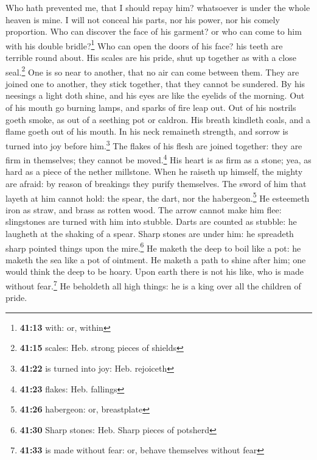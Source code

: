  Who hath prevented me, that I should repay him?
whatsoever is under the whole heaven is mine.  I will not
conceal his parts, nor his power, nor his comely proportion.
 Who can discover the face of his garment? or who can
come to him with his double bridle?\footnote{\textbf{41:13} with: or,
  within}  Who can open the doors of his face? his teeth
are terrible round about.  His scales are his pride, shut
up together as with a close seal.\footnote{\textbf{41:15} scales: Heb.
  strong pieces of shields}  One is so near to another,
that no air can come between them.  They are joined one
to another, they stick together, that they cannot be sundered.
 By his neesings a light doth shine, and his eyes are
like the eyelids of the morning.  Out of his mouth go
burning lamps, and sparks of fire leap out.  Out of his
nostrils goeth smoke, as out of a seething pot or caldron.
 His breath kindleth coals, and a flame goeth out of his
mouth.  In his neck remaineth strength, and sorrow is
turned into joy before him.\footnote{\textbf{41:22} is turned into joy:
  Heb. rejoiceth}  The flakes of his flesh are joined
together: they are firm in themselves; they cannot be moved.\footnote{\textbf{41:23}
  flakes: Heb. fallings}  His heart is as firm as a
stone; yea, as hard as a piece of the nether millstone. 
When he raiseth up himself, the mighty are afraid: by reason of
breakings they purify themselves.  The sword of him that
layeth at him cannot hold: the spear, the dart, nor the
habergeon.\footnote{\textbf{41:26} habergeon: or, breastplate}
 He esteemeth iron as straw, and brass as rotten wood.
 The arrow cannot make him flee: slingstones are turned
with him into stubble.  Darts are counted as stubble: he
laugheth at the shaking of a spear.  Sharp stones are
under him: he spreadeth sharp pointed things upon the mire.\footnote{\textbf{41:30}
  Sharp stones: Heb. Sharp pieces of potsherd}  He maketh
the deep to boil like a pot: he maketh the sea like a pot of ointment.
 He maketh a path to shine after him; one would think the
deep to be hoary.  Upon earth there is not his like, who
is made without fear.\footnote{\textbf{41:33} is made without fear: or,
  behave themselves without fear}  He beholdeth all high
things: he is a king over all the children of pride.

